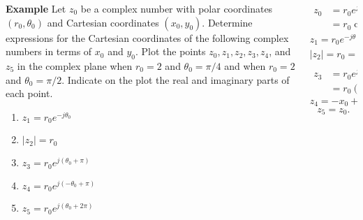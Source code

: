 \begin{frame}
    \begin{columns}[T]
        \begin{column}{0.5\textwidth}
            {\bf Example} Let $z_0$ be a complex number with polar coordinates $(r_0, \theta_0)$ and Cartesian coordinates $(x_0, y_0)$. Determine expressions for the Cartesian coordinates of the following complex numbers in terms of $x_0$ and $y_0$. Plot the points $z_0, z_1, z_2, z_3, z_4$, and $z_5$ in the complex plane when $r_0 = 2$ and $\theta_0 = \pi/4$ and when $r_0 = 2$ and $\theta_0 = \pi/2$. Indicate on the plot the real and imaginary parts of each point.
            \begin{enumerate}[<alert@+>]
                \item $z_1 = r_0e^{-j\theta_0}$
                \item $|z_2| = r_0$
                \item $z_3 = r_0e^{j(\theta_0 + \pi)}$
                \item $z_4 = r_0e^{j(-\theta_0 + \pi)}$
                \item $z_5 = r_0e^{j(\theta_0 + 2\pi)}$
            \end{enumerate}

        \end{column}
            \begin{column}{0.5\textwidth}
            \begin{align*}
                z_0 &= r_0e^{j\theta_0} = r_0(\cos\theta_0 + j\sin\theta_0)\\ &= r_0\cos\theta_0 + jr_0\sin\theta_0 = x_0 + jy_0.
            \end{align*}
            \begin{equation*}
                z_1 = r_0e^{-j\theta} = r_0(\cos(-\theta_0) + j\sin(-\theta_0)) = x_0 - jy_0.
            \end{equation*}
            \begin{equation*}
                |z_2| = r_0 = \sqrt{x_0^2+y_0^2}
            \end{equation*}
            \begin{align*}
                z_3 &= r_0e^{j(\theta_0 + \pi)}\\&= r_0(\cos(\theta_0 + \pi) + \sin(\theta_0 + \pi)) = -x_0 - jy_0 = -z_0.
            \end{align*}
            \begin{equation*}
                z_4 = -x_0 + jy_0.
            \end{equation*}
            \begin{equation*}
                z_5 = z_0.
            \end{equation*}
        \end{column}
    \end{columns}
\end{frame}



